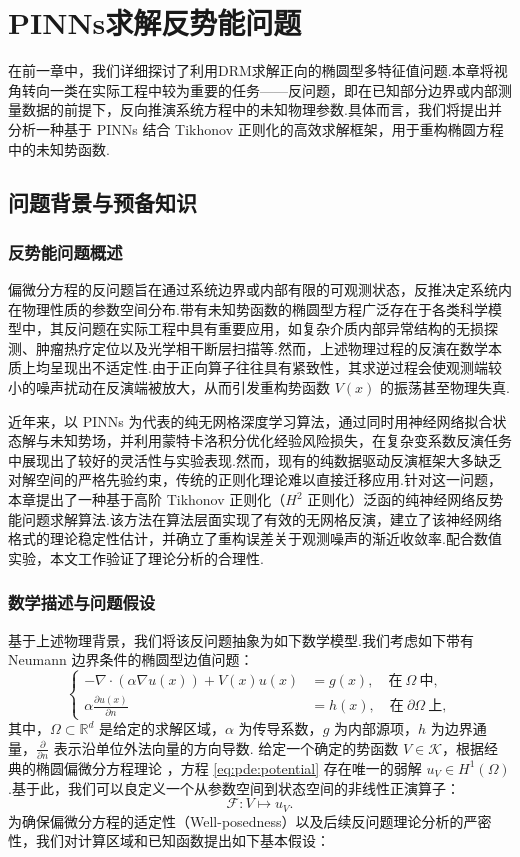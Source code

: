 \chapter{PINNs求解反势能问题}
在前一章中，我们详细探讨了利用DRM求解正向的椭圆型多特征值问题.本章将视角转向一类在实际工程中较为重要的任务——反问题，即在已知部分边界或内部测量数据的前提下，反向推演系统方程中的未知物理参数.具体而言，我们将提出并分析一种基于 PINNs 结合 Tikhonov 正则化的高效求解框架，用于重构椭圆方程中的未知势函数.
\section{问题背景与预备知识}
\subsection{反势能问题概述}
偏微分方程的反问题旨在通过系统边界或内部有限的可观测状态，反推决定系统内在物理性质的参数空间分布.带有未知势函数的椭圆型方程广泛存在于各类科学模型中，其反问题在实际工程中具有重要应用，如复杂介质内部异常结构的无损探测、肿瘤热疗定位以及光学相干断层扫描等.然而，上述物理过程的反演在数学本质上均呈现出不适定性.由于正向算子往往具有紧致性，其求逆过程会使观测端较小的噪声扰动在反演端被放大，从而引发重构势函数 $V(x)$ 的振荡甚至物理失真.

近年来，以 PINNs 为代表的纯无网格深度学习算法，通过同时用神经网络拟合状态解与未知势场，并利用蒙特卡洛积分优化经验风险损失，在复杂变系数反演任务中展现出了较好的灵活性与实验表现\cite{jin2023conductivity,duan2024recovering,duan2024recovering}.然而，现有的纯数据驱动反演框架大多缺乏对解空间的严格先验约束，传统的正则化理论难以直接迁移应用.针对这一问题，本章提出了一种基于高阶 Tikhonov 正则化（$H^2$ 正则化）泛函的纯神经网络反势能问题求解算法.该方法在算法层面实现了有效的无网格反演，建立了该神经网络格式的理论稳定性估计，并确立了重构误差关于观测噪声的渐近收敛率.配合数值实验，本文工作验证了理论分析的合理性.

\subsection{数学描述与问题假设}
基于上述物理背景，我们将该反问题抽象为如下数学模型.我们考虑如下带有 Neumann 边界条件的椭圆型边值问题：
\begin{equation}\label{eq:pde:potential}
\left\{
\begin{aligned}
-\nabla\cdot(\alpha\nabla u(x))+V(x)u(x)&=g(x), \quad \text{在}~\Omega~\text{中},\\
\alpha\frac{\partial u(x)}{\partial n}&=h(x), \quad \text{在}~\partial\Omega~\text{上},
\end{aligned}
\right.
\end{equation}
其中，$\Omega \subset \mathbb{R}^{d}$ 是给定的求解区域，$\alpha$ 为传导系数，$g$ 为内部源项，$h$ 为边界通量，$\frac{\partial}{\partial n}$ 表示沿单位外法向量的方向导数.
给定一个确定的势函数 $V \in \mathcal{K}$，根据经典的椭圆偏微分方程理论 \cite{evans2010partial}，方程 \eqref{eq:pde:potential} 存在唯一的弱解 $u_V\in H^{1}(\Omega)$.基于此，我们可以良定义一个从参数空间到状态空间的非线性正演算子：
$$\mathcal{F}: V \mapsto u_V.$$
为确保偏微分方程的适定性（Well-posedness）以及后续反问题理论分析的严密性，我们对计算区域和已知函数提出如下基本假设：


